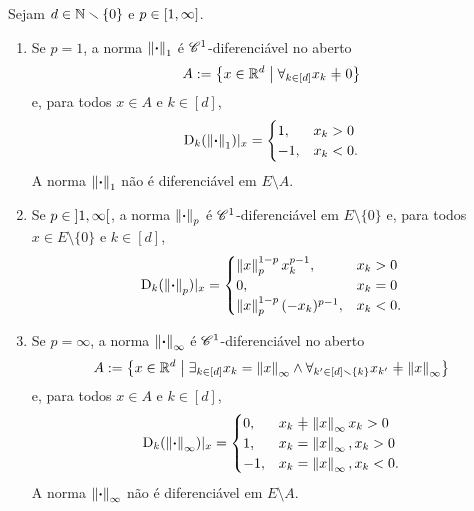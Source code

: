 \begin{proposition}
Sejam $d \in \mathbb{N} \smallsetminus \{0\}$ e $p \in \left[1,\allowbreak \infty\right]$.
	\begin{enumerate}
		\item Se $p = 1$, a norma $\left\Vert{\bm{\cdot}}\right\Vert_1$ é $\mathscr{C}^1$-diferenciável no aberto
			\begin{equation*}
			A := \set{x \in \R^d}{\forall_{k \in [d]} x_k \neq 0}
			\end{equation*}
		e, para todos $x \in A$ e $k \in [d]$,
			\begin{equation*}
			\mathrm{D}_k (\left\Vert{\bm{\cdot}}\right\Vert_1)|_{x} =
				\begin{cases}
				1,	& x_k > 0 \\
				-1,	& x_k < 0.
				\end{cases}
			\end{equation*}
		A norma $\left\Vert{\bm{\cdot}}\right\Vert_1$ não é diferenciável em $E \setminus A$.

		\item Se $p \in \left]1,\allowbreak \infty\right[$, a norma $\left\Vert{\bm{\cdot}}\right\Vert_p$ é $\mathscr{C}^1$-diferenciável em $E \setminus \{0\}$ e, para todos $x \in E \setminus \{0\}$ e $k \in [d]$,
			\begin{equation*}
			\mathrm{D}_k (\left\Vert{\bm{\cdot}}\right\Vert_p)|_{x} =
				\begin{cases}
				\left\Vert{x}\right\Vert_p^{1-p} x_k^{p-1},		& x_k > 0 \\
				0,								& x_k = 0 \\
				\left\Vert{x}\right\Vert_p^{1-p} (-x_k)^{p-1},	& x_k < 0.
				\end{cases}
			\end{equation*}

		\item Se $p = \infty$, a norma $\left\Vert{\bm{\cdot}}\right\Vert_{\infty}$ é $\mathscr{C}^1$-diferenciável no aberto
			\begin{equation*}
			A := \set{x \in \R^d}{\exists_{k \in [d]} x_k = \nor{x}_{\infty} \land \forall_{k' \in [d] \setminus \{k\}} x_{k'} \neq \nor{x}_{\infty}}
			\end{equation*}
		e, para todos $x \in A$ e $k \in [d]$,
			\begin{equation*}
			\D_k (\nor{\var}_{\infty})|_{x} =
				\begin{cases}
				0,	& x_k \neq \nor{x}_{\infty} x_k > 0 \\
				1,	& x_k = \nor{x}_{\infty}, x_k > 0 \\
				-1,	& x_k = \nor{x}_{\infty}, x_k < 0.
				\end{cases}
			\end{equation*}
		A norma $\left\Vert{\bm{\cdot}}\right\Vert_{\infty}$ não é diferenciável em $E \setminus A$.
	\end{enumerate}
\end{proposition}






